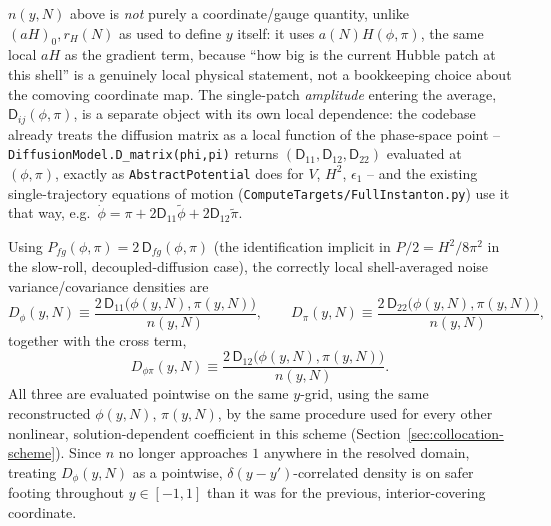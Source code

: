 \documentclass[a4paper,11pt]{article}
\newcommand{\semibold}[1]{{\fontseries{b}\selectfont{#1}}}
\newenvironment{panel}{\begin{tcolorbox}[enhanced,breakable,colback=gray!10,colframe=gray!30]\small}{\end{tcolorbox}}
\newcommand{\Ny}{N}                          %
\newcommand{\Hub}{H}                         %
\newcommand{\sfactor}{a}                     %
\newcommand{\atloc}{(\field,\mom)}           %
\newcommand{\field}{\phi}                    %
\newcommand{\mom}{\pi}                       %
\newcommand{\rfield}{\widetilde\field}       %
\newcommand{\rmom}{\widetilde\mom}           %
\newcommand{\rad}{r}                         %
\newcommand{\yco}{y}                         %
\newcommand{\aHo}{(\sfactor \Hub)_0}         %
\newcommand{\aHloc}{\sfactor(\Ny)\Hub\atloc} %
\newcommand{\rH}{\rad_H}                     %
\newcommand{\Dnoise}[1]{D_{#1}}              %
\newcommand{\Dcm}[1]{\mathsf{D}_{#1}}        %
\newcommand{\Pspec}[1]{P_{#1}}               %
\newcommand{\ncount}{n}                      %
\begin{document}
\begin{panel}
\semibold{Geometric dilution versus local amplitude.} $\ncount(\yco,\Ny)$
above is \emph{not} purely a coordinate/gauge quantity, unlike $\aHo,\rH(\Ny)$
as used to define $\yco$ itself: it uses $\aHloc$, the same local $aH$ as
the gradient term, because ``how big is the current Hubble patch at this
shell'' is a genuinely local physical statement, not a bookkeeping choice
about the comoving coordinate map. The single-patch \emph{amplitude}
entering the average, $\Dcm{ij}(\field,\mom)$, is a separate object with
its own local dependence: the codebase already treats the diffusion matrix
as a local function of the phase-space point --
\texttt{DiffusionModel.D\_matrix(phi,pi)} returns $(\Dcm{11},\Dcm{12},\Dcm{22})$
evaluated at $(\field,\mom)$, exactly as \texttt{AbstractPotential} does for
$V$, $H^2$, $\epsilon_1$ -- and the existing single-trajectory equations of
motion (\texttt{ComputeTargets/FullInstanton.py}) use it that way,
e.g.\ $\dot\field = \mom + 2\Dcm{11}\rfield + 2\Dcm{12}\rmom$.
\end{panel}

Using $\Pspec{fg}\atloc = 2\,\Dcm{fg}\atloc$ (the identification implicit in
$\Pspec{}/2 = H^2/8\pi^2$ in the slow-roll, decoupled-diffusion case), the
correctly local shell-averaged noise variance/covariance densities are
\begin{equation}
    \Dnoise{\field}(\yco,\Ny) \equiv \frac{2\,\Dcm{11}\big(\field(\yco,\Ny),\mom(\yco,\Ny)\big)}{\ncount(\yco,\Ny)} ,
    \qquad
    \Dnoise{\mom}(\yco,\Ny) \equiv \frac{2\,\Dcm{22}\big(\field(\yco,\Ny),\mom(\yco,\Ny)\big)}{\ncount(\yco,\Ny)} ,
    \label{eq:Dnoise-diag}
\end{equation}
together with the cross term,
\begin{equation}
    \Dnoise{\field\mom}(\yco,\Ny) \equiv \frac{2\,\Dcm{12}\big(\field(\yco,\Ny),\mom(\yco,\Ny)\big)}{\ncount(\yco,\Ny)} .
    \label{eq:Dnoise-cross}
\end{equation}
All three are evaluated pointwise on the same $\yco$-grid, using the same
reconstructed $\field(\yco,\Ny)$, $\mom(\yco,\Ny)$, by the same procedure
used for every other nonlinear, solution-dependent coefficient in this
scheme (Section~\ref{sec:collocation-scheme}). Since $\ncount$ no longer
approaches $1$ anywhere in the resolved domain, treating
$\Dnoise{\field}(\yco,\Ny)$ as a pointwise, $\delta(\yco-\yco')$-correlated
density is on safer footing throughout $\yco\in[-1,1]$ than it was for the
previous, interior-covering coordinate.
\end{document}
